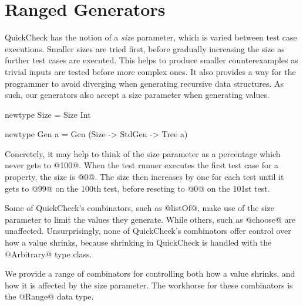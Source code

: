 \section{Ranged Generators}

QuickCheck has the notion of a \emph{size} parameter, which is varied between test case executions. Smaller sizes are tried first, before gradually increasing the size as further test cases are executed. This helps to produce smaller counterexamples as trivial inputs are tested before more complex ones. It also provides a way for the programmer to avoid diverging when generating recursive data structures. As such, our generators also accept a size parameter when generating values. 

\begin{code}
  newtype Size =
    Size Int

  newtype Gen a =
    Gen (Size -> StdGen -> Tree a)
\end{code}

Concretely, it may help to think of the size parameter as a percentage which never gets to @100@. When the test runner executes the first test case for a property, the size is @0@. The size then increases by one for each test until it gets to @99@ on the 100th test, before reseting to @0@ on the 101st test.

%
%


Some of QuickCheck's combinators, such as @listOf@, make use of the size parameter to limit the values they generate. While others, such as @choose@ are unaffected. Unsurprisingly, none of QuickCheck's combinators offer control over how a value shrinks, because shrinking in QuickCheck is handled with the @Arbitrary@ type class.

We provide a range of combinators for controlling both how a value shrinks, and how it is affected by the size parameter. The workhorse for these combinators is the @Range@ data type.

